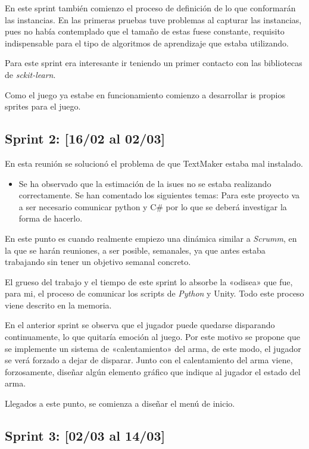 En este sprint también comienzo el proceso de definición de lo que conformarán las instancias. En las primeras pruebas tuve problemas al capturar las instancias, pues no había contemplado que el tamaño de estas fuese constante, requisito indispensable para el tipo de algoritmos de aprendizaje que estaba utilizando.

Para este sprint era interesante ir teniendo un primer contacto con las bibliotecas de \emph{sckit-learn}.

Como el juego ya estabe en funcionamiento comienzo a desarrollar is propios sprites para el juego.


\subsection{Sprint 2: [16/02 al 02/03]}

 En esta reunión se solucionó el problema de que TextMaker estaba mal instalado.
\begin{itemize}
    \item Se ha observado que la estimación de la isues no se estaba realizando correctamente.
    Se han comentado los siguientes temas: Para este proyecto va a ser necesario comunicar python y C\# por lo que se deberá investigar la forma de hacerlo.
\end{itemize}

En este punto es cuando realmente empiezo una dinámica similar a \emph{Scrumm}, en la que se harán reuniones, a ser posible, semanales, ya que antes estaba trabajando sin tener un objetivo semanal concreto.

El grueso del trabajo y el tiempo de este sprint lo absorbe la «odisea» que fue, para mi, el proceso de comunicar los scripts de \emph{Python} y Unity. Todo este proceso viene descrito en la memoria.

En el anterior sprint se observa que el jugador puede quedarse disparando continuamente, lo que quitaría emoción al juego. Por este motivo se propone que se implemente un sistema de «calentamiento» del arma, de este modo, el jugador se verá forzado a dejar de disparar. Junto con el calentamiento del arma viene, forzosamente, diseñar algún elemento gráfico que indique al jugador el estado del arma.

Llegados a este punto, se comienza a diseñar el menú de inicio.


\subsection{Sprint 3:  [02/03 al 14/03]}


